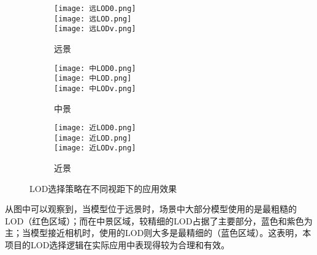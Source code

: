 \begin{figure*}[h]
    \centering
    \begin{subfigure}[b]{0.32\linewidth}
        \centering
        \texttt{[image: 远LOD0.png]}\\
        \vspace{0.02cm}
        \texttt{[image: 远LOD.png]}\\
        \vspace{0.02cm}
        \texttt{[image: 远LODv.png]}\\
        \vspace{0.02cm}
        \caption{远景}
    \end{subfigure}%
    \hfill %
    \begin{subfigure}[b]{0.32\linewidth}
        \centering
        \texttt{[image: 中LOD0.png]}\\
        \vspace{0.02cm}
        \texttt{[image: 中LOD.png]}\\
        \vspace{0.02cm}
        \texttt{[image: 中LODv.png]}\\
        \vspace{0.02cm}
        \caption{中景}
    \end{subfigure}%
    \hfill %
    \begin{subfigure}[b]{0.32\linewidth}
        \centering
        \texttt{[image: 近LOD0.png]}\\
        \vspace{0.02cm}
        \texttt{[image: 近LOD.png]}\\
        \vspace{0.02cm}
        \texttt{[image: 近LODv.png]}\\
        \vspace{0.02cm}
        \caption{近景}
    \end{subfigure}
    \caption{LOD选择策略在不同视距下的应用效果}
    \vspace{-0.2cm}
    \label{fig:LOD select}
\end{figure*}

从图中可以观察到，当模型位于远景时，场景中大部分模型使用的是最粗糙的LOD（红色区域）；而在中景区域，较精细的LOD占据了主要部分，蓝色和紫色为主；当模型接近相机时，使用的LOD则大多是最精细的（蓝色区域）。这表明，本项目的LOD选择逻辑在实际应用中表现得较为合理和有效。

